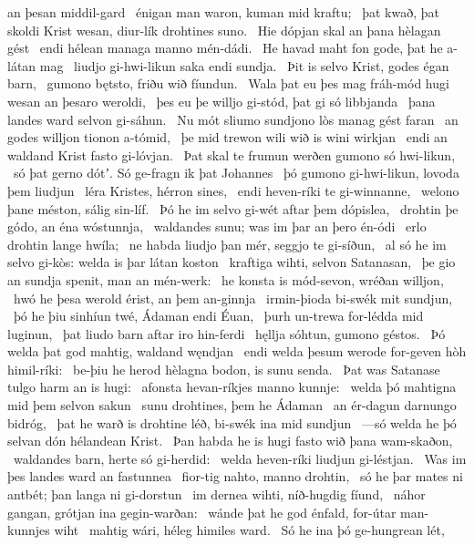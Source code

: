 an þesan middil-gard \hld\ énigan man waron,
kuman mid kraftu; \hld\ þat kwað, þat skoldi Krist wesan,
diur-lík drohtines suno. \hld\ Hie dópjan skal
an þana hèlagan gést \hld\ endi hélean managa %
manno mén-dádi. \hld\ He havad maht fon gode,
þat he a-látan mag \hld\ liudjo gi-hwi-likun
saka endi sundja. \hld\ Þit is selvo Krist,
godes égan barn, \hld\ gumono bętsto,
friðu wið fíundun. \hld\ Wala þat eu þes mag fráh-mód hugi
wesan an þesaro weroldi, \hld\ þes eu þe willjo gi-stód,
þat gi só libbjanda \hld\ þana landes ward
selvon gi-sáhun. \hld\ Nu mót sliumo sundjono lòs
manag gést faran \hld\ an godes willjon
tionon a-tómid, \hld\ þe mid trewon wili
wið is wini wirkjan \hld\ endi an waldand Krist
fasto gi-lóvjan. \hld\ Þat skal te frumun werðen
gumono só hwi-likun, \hld\ só þat gerno dótʼ.
Só ge-fragn ik þat Johannes \hld\ þó gumono gi-hwi-likun,
lovoda þem liudjun \hld\ léra Kristes,
hérron sines, \hld\ endi heven-ríki
te gi-winnanne, \hld\ welono þane méston,
sálig sin-líf. \hld\ Þó he im selvo gi-wét
aftar þem dópislea, \hld\ drohtin þe gódo,
an éna wóstunnja, \hld\ waldandes sunu;
was im þar an þero én-ódi \hld\ erlo drohtin
lange hwíla; \hld\ ne habda liudjo þan mér,
seggjo te gi-síðun, \hld\ al só he im selvo gi-kòs:
welda is þar látan koston \hld\ kraftiga wihti,
selvon Satanasan, \hld\ þe gio an sundja spenit,
man an mén-werk: \hld\ he konsta is mód-sevon,
wréðan willjon, \hld\ hwó he þesa werold érist,
an þem an-ginnja \hld\ irmin-þioda
bi-swék mit sundjun, \hld\ þó he þiu sinhíun twé,
Ádaman endi Éuan, \hld\ þurh un-trewa
for-lédda mid luginun, \hld\ þat liudo barn
aftar iro hin-ferdi \hld\ hęllja sóhtun,
gumono géstos. \hld\ Þó welda þat god mahtig,
waldand węndjan \hld\ endi welda þesum werode for-geven
hòh himil-ríki: \hld\ be-þiu he herod hèlagna bodon,
is sunu senda. \hld\ Þat was Satanase
tulgo harm an is hugi: \hld\ afonsta hevan-ríkjes
manno kunnje: \hld\ welda þó mahtigna
mid þem selvon sakun \hld\ sunu drohtines,
þem he Ádaman \hld\ an ér-dagun
darnungo bidróg, \hld\ þat he warð is drohtine léð,
bi-swék ina mid sundjun \hld\ —só welda he þó selvan dón
hélandean Krist. \hld\ Þan habda he is hugi fasto
wið þana wam-skaðon, \hld\ waldandes barn,
herte só gi-herdid: \hld\ welda heven-ríki
liudjun gi-léstjan. \hld\ Was im þes landes ward
an fastunnea \hld\ fior-tig nahto,
manno drohtin, \hld\ só he þar mates ni antbét;
þan langa ni gi-dorstun \hld\ im dernea wihti,
níð-hugdig fíund, \hld\ náhor gangan,
grótjan ina gegin-warðan: \hld\ wánde þat he god énfald,
for-útar man-kunnjes wiht \hld\ mahtig wári,
héleg himiles ward. \hld\ Só he ina þó ge-hungrean lét,
